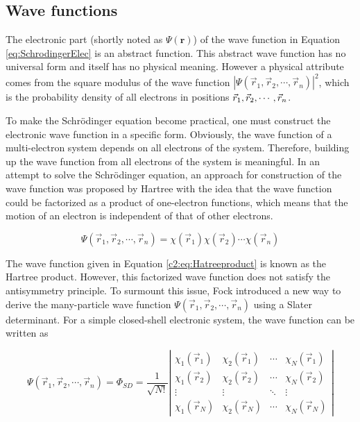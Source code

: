 \begin{refsection}

\subsection{Wave functions}

The electronic part (shortly noted as $\Psi(\mathbf{r})$) of the wave function in Equation \ref{eq:SchrodingerElec} is an abstract function. This abstract wave function has no universal form and itself has no physical meaning. However a physical attribute comes from the square modulus of the wave function $\left|\Psi(\vec{r}_1,\vec{r}_2,\cdots,\vec{r}_n)\right|^2$, which is the probability density of all electrons in positions $\vec{r}_1, \vec{r}_2, \-\cdots ,\vec{r}_n$.

To make the Schr\"odinger equation become practical, one must construct the electronic wave function in a specific form. Obviously, the wave function of a multi-electron system depends on all electrons of the system. Therefore, building up the wave function from all electrons of the system is meaningful. In an attempt to solve the Schr\"odinger equation, an approach for construction of the wave function was proposed by Hartree with the idea that the wave function could be factorized as a product of one-electron functions,\cite{c1:24:Szabo1996} which means that the motion of an electron is independent of that of other electrons.

\begin{equation}
	\label{c2:eq:Hatreeproduct}
\Psi(\vec{r}_1,\vec{r}_2,\cdots,\vec{r}_n) = \chi(\vec{r}_1)\chi(\vec{r}_2)\cdots\chi(\vec{r}_n)
\end{equation}

\noindent The wave function given in Equation \ref{c2:eq:Hatreeproduct} is known as the Hartree product. However, this factorized wave function does not satisfy the antisymmetry principle. To surmount this issue, Fock introduced a new way to derive the many-particle wave function $\Psi(\vec{r}_1,\vec{r}_2,\cdots,\vec{r}_n)$ using a Slater determinant. For a simple closed-shell electronic system, the wave function can be written as 

\begin{equation}
\Psi(\vec{r}_1,\vec{r}_2,\cdots,\vec{r}_n) = \Phi_{SD} =
\frac{1}{\sqrt{N!}}\left|\begin{matrix}
\chi_1(\vec{r}_1) & \chi_2(\vec{r}_1) & \cdots & \chi_N(\vec{r}_1) \\
\chi_1(\vec{r}_2) & \chi_2(\vec{r}_2) & \cdots & \chi_N(\vec{r}_2) \\
\vdots            & \vdots      	  & \ddots & \vdots            \\
\chi_1(\vec{r}_N) & \chi_2(\vec{r}_N) & \cdots & \chi_N(\vec{r}_N)
\end{matrix}\right|
\label{eq:SlaterWaveFucntion}
\end{equation}


\end{refsection}
